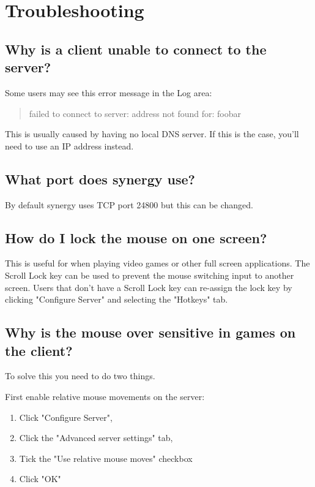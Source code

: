 \section{Troubleshooting}

\subsection*{Why is a client unable to connect to the server?}

Some users may see this error message in the Log area:

\begin{quote}
failed to connect to server: address not found for: foobar
\end{quote}

This is usually caused by having no local DNS server. If this is the case, 
you'll need to use an IP address instead.

\subsection*{What port does synergy use?}

By default synergy uses TCP port 24800 but this can be changed.

\subsection*{How do I lock the mouse on one screen?}

This is useful for when playing video games or other full screen applications.
The Scroll Lock key can be used to prevent the mouse switching input to
another screen. Users that don't have a Scroll Lock key can re-assign
the lock key by clicking "Configure Server" and selecting the "Hotkeys" tab.

\subsection*{Why is the mouse over sensitive in games on the client?}

To solve this you need to do two things.

First enable relative mouse movements on the server:
\begin{enumerate}
  \item Click "Configure Server",
  \item Click the "Advanced server settings" tab,
  \item Tick the "Use relative mouse moves" checkbox
  \item Click "OK"
\end{enumerate}

